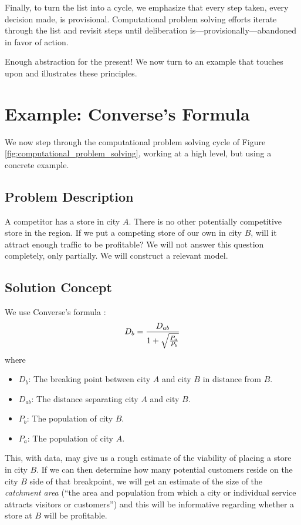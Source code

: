Finally, to turn the list into a cycle, we emphasize that every step taken, every decision made, is  provisional. Computational problem solving efforts iterate through the list and revisit steps until deliberation is---provisionally---abandoned in favor of action.

Enough abstraction for the present! We now turn to an example that touches upon and illustrates these principles.


\section{Example: Converse's Formula}

We now step through the computational problem solving cycle of Figure \ref{fig:computational_problem_solving}, working at a high level, but using a concrete example.

\subsection{Problem Description}

A competitor has a store in city $A$. There is no other potentially competitive store  in the region. If we put a competing store of our own in city $B$, will it attract enough traffic to be profitable?
We will not answer this question completely, only partially. We will construct a relevant model.

\subsection{Solution Concept}

We use Converse's formula \cite[page 432]{eiselt_marianov_eds_2011}:
\begin{equation}
D_b = \frac{D_{ab}}{1 + \sqrt{\frac{P_a}{P_b}}} \label{exp:converse}\index{Converse's formula}
\end{equation}
where
\begin{itemize}
\item $D_b$: The breaking point between city $A$ and city $B$ in distance from $B$.
\item $D_{ab}$: The distance separating city $A$ and city $B$.
\item $P_b$: The population of city $B$.
\item $P_a$: The population of city $A$.
\end{itemize}
This, with data, may give us a rough estimate of the viability of placing a store in city $B$.
If we can then determine how many potential customers reside on the  city $B$ side of that breakpoint, we will get an estimate of the size of the \emph{catchment area} (``the area and population from which a city or individual service attracts visitors or customers'') and this will be informative regarding whether a store at $B$ will be profitable.


